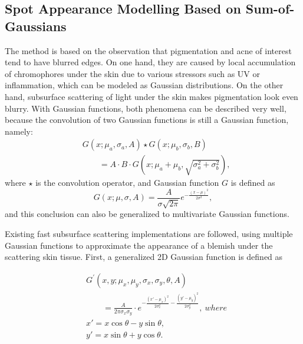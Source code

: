 \begin{spacing}{1.5}
\section{Spot Appearance Modelling Based on Sum-of-Gaussians}
The method is based on the observation that pigmentation and acne of interest tend to have blurred edges. On one hand, they are caused by local accumulation of chromophores under the skin due to various stressors such as UV or inflammation, which can be modeled as Gaussian distributions. On the other hand, subsurface scattering of light under the skin makes pigmentation look even blurry. With Gaussian functions, both phenomena can be described very well, because the convolution of two Gaussian functions is still a Gaussian function, namely:
\begin{equation}
    \begin{aligned}
         & G(x; \mu_a, \sigma_a, A)\star G(x; \mu_b, \sigma_b, B)                 \\
         & \qquad= A\cdot B\cdot G(x; \mu_a+\mu_b, \sqrt{\sigma_a^2+\sigma_b^2}),
    \end{aligned}
\end{equation}
where $\star$ is the convolution operator, and Gaussian function $G$ is defined as
\begin{equation}
    G(x; \mu, \sigma, A) = \frac{A}{\sigma\sqrt{2\pi}}e^{-\frac{{(x - \mu)^2}}{{2\sigma^2}}},
\end{equation}
and this conclusion can also be generalized to multivariate Gaussian functions.

Existing fast subsurface scattering implementations are followed, using multiple Gaussian functions to approximate the appearance of a blemish under the scattering skin tissue. First, a generalized 2D Gaussian function is defined as

\begin{equation}
    \begin{aligned}
         & G^\prime(x, y; \mu_x, \mu_y, \sigma_x, \sigma_y, \theta, A)                                                                                 \\
         & \qquad=\frac{A}{2\pi \sigma_x \sigma_y}\cdot e^{-\frac{{(x' - \mu_x)^2}}{{2 \sigma_x^2}} - \frac{{(y' - \mu_y)^2}}{{2 \sigma_y^2}}},\ where \\
         & x' = x \cos\theta - y \sin\theta,                                                                                                           \\
         & y' = x \sin\theta + y \cos\theta.
    \end{aligned}
\end{equation}


\end{spacing}
